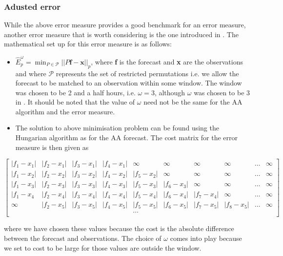\documentclass[a4paper]{article}
\begin{document}
\subsubsection{Adusted error}
\label{subsubsec:Adj_err} While the above error measure provides a good benchmark for an error measure, another error measure that is worth considering is the one introduced in \citet{dan14}. The mathematical set up for this error measure is as follows:
\begin{itemize}
\item $\hat{E}_p^\omega = \displaystyle{\min_{P \in \mathscr{P}}||P\textbf{f}-\textbf{x}||_p}$, where \textbf{f} is the forecast and \textbf{x} are the observations and where $\mathscr{P}$ represents the set of restricted permutations i.e. we allow the forecast to be matched to an observation within some window. The window was chosen to be 2 and a half hours, i.e. $\omega = 3$, although $\omega$ was chosen to be 3 in \cite{dan14}. It should be noted that the value of $\omega$ need not be the same for the AA algorithm and the error measure.
\item The solution to above minimisation problem can be found using the Hungarian algorithm as for the AA forecast. The cost matrix for the error measure is then given as
\end{itemize}

\centerline{$\begin{bmatrix}
    |f_1 - x_1| & |f_2 - x_1| & |f_3 - x_1| & |f_4 - x_1|  & \infty& \infty& \infty &\infty & \dots & \infty \\
    |f_1 - x_2| & |f_2 - x_2| & |f_3 - x_2| &  |f_4 - x_2| & |f_5 - x_2| & \infty  &\infty & \infty & \dots & \infty\\
    |f_1 - x_3| & |f_2 - x_3| & |f_3 - x_3| &  |f_4 - x_3|& |f_5- x_3|& |f_6 - x_3| & \infty&\infty & \dots  & \infty\\
    |f_1 - x_4 & |f_2 - x_4| & |f_3 - x_4| & |f_4 - x_4| &  |f_5 - x_4|& |f_6- x_4|& |f_7 - x_4| & \infty&\dots & \infty\\
    \infty & |f_2 - x_5| & |f_3 - x_5| & |f_4 - x_5| &  |f_5 - x_5|& |f_6- x_5|& |f_7 - x_5| & |f_8 -x_5|&\dots & \infty\\
   &&&& \dots &&&&& \\
\end{bmatrix}$}

\noindent where we have chosen these values because the cost is the absolute difference between the forecast and observations. The choice of $\omega$ comes into play because we set to cost to be large for those values are outside the window.
\end{document}
